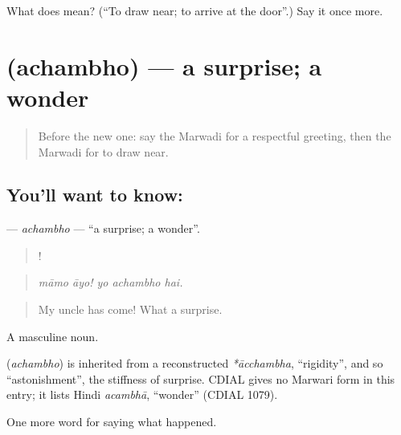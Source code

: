 \begin{tcolorbox}[breakable,colback=teal!4,colframe=teal!35!black,title={Before you move on}]
What does  mean? (\textquotedblleft{}To draw near; to arrive at the door\textquotedblright{}.) Say it once more.
\end{tcolorbox}
\section[\texorpdfstring{\mw{अचंभो} (achambho)}{अचंभो (achambho)}]{ (achambho) — a surprise; a wonder}

\label{lesson:MW-C245-achambho}



\begin{quote}
Before the new one: say the Marwadi for a respectful greeting, then the Marwadi for to draw near.
\end{quote}

\subsection*{You'll want to know: }
\textbf{} — \emph{achambho} — \textquotedblleft{}a surprise; a wonder\textquotedblright{}.

\begin{quote}
 !   
\end{quote}

\begin{quote}
\emph{māmo āyo! yo achambho hai.}
\end{quote}

\begin{quote}
My uncle has come! What a surprise.
\end{quote}

A masculine noun.

\begin{cousinweb}
\textbf{} (\emph{achambho}) is inherited from a reconstructed \emph{*ācchambha}, \textquotedblleft{}rigidity\textquotedblright{}, and so \textquotedblleft{}astonishment\textquotedblright{}, the stiffness of surprise. CDIAL gives no Marwari form in this entry; it lists Hindi \emph{acambhā}, \textquotedblleft{}wonder\textquotedblright{} (CDIAL 1079).
\end{cousinweb}

\begin{grammarlens}[title={What you've built}]
One more word for saying what happened.
\end{grammarlens}


